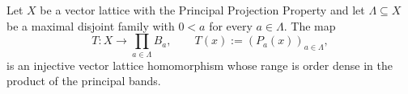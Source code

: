 \begin{theorem}
\label{thm:exists-orderDense-lattice-embedding-of-isMaximalDisjoint}
\leanok
{}
Let $X$ be a vector lattice with the Principal Projection Property
and let $\Lambda \subseteq X$ be a maximal disjoint family with
$0 < a$ for every $a \in \Lambda$. The map
\[
  T \colon X \to \prod_{a \in \Lambda} B_a, \qquad
  T(x) := (P_a(x))_{a \in \Lambda},
\]
is an injective vector lattice homomorphism whose range is order
dense in the product of the principal bands.
\end{theorem}

